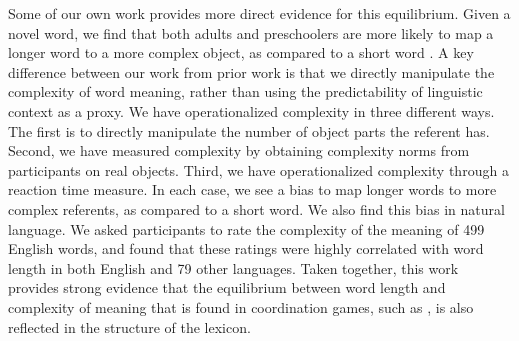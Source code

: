 \documentclass[man, noapacite, 12pt]{apa2}
\begin{document}
Some of our own work provides more direct evidence for this equilibrium. Given a novel word, we find that both adults and preschoolers are more likely to map a longer word to a more complex object, as compared to a short word \cite{lewis2014structure}. A key difference between our work from prior work is that we  directly manipulate the complexity of word meaning, rather than using the predictability of linguistic context as a proxy. We have operationalized complexity in three different ways. The first is to directly manipulate the number of object parts the referent has. Second, we have measured complexity by obtaining complexity norms from participants on real objects. Third, we have operationalized complexity through a reaction time measure. In each case, we see a bias to map longer words to more complex referents, as compared to a short word. We also find this bias in natural language. We asked participants to rate the complexity of the meaning  of 499 English words, and found that these ratings were highly correlated with word length in both English and 79 other languages. Taken together, this work provides strong evidence that the equilibrium between word length and complexity of meaning that is found in coordination games, such as , is also reflected in the structure of the lexicon. 
\end{document}

